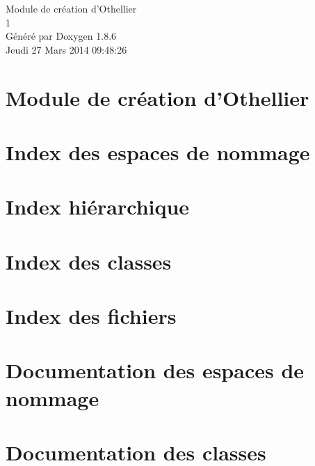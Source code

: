 \documentclass[twoside]{book}
\newcommand{\clearemptydoublepage}{%
  \newpage{\pagestyle{empty}\cleardoublepage}%
}
\begin{document}
\hypersetup{pageanchor=false}
\begin{titlepage}
\vspace*{7cm}
\begin{center}%
{\Large Module de création d'Othellier \\[1ex]\large 1 }\\
\vspace*{1cm}
{\large Généré par Doxygen 1.8.6}\\
\vspace*{0.5cm}
{\small Jeudi 27 Mars 2014 09:48:26}\\
\end{center}
\end{titlepage}
\clearemptydoublepage
\tableofcontents
\clearemptydoublepage
{}
\hypersetup{pageanchor=true}

\chapter{Module de création d'Othellier}
\label{index}\hypertarget{index}{}
\chapter{Index des espaces de nommage}

\chapter{Index hiérarchique}

\chapter{Index des classes}

\chapter{Index des fichiers}

\chapter{Documentation des espaces de nommage}




\chapter{Documentation des classes}









\end{document}
